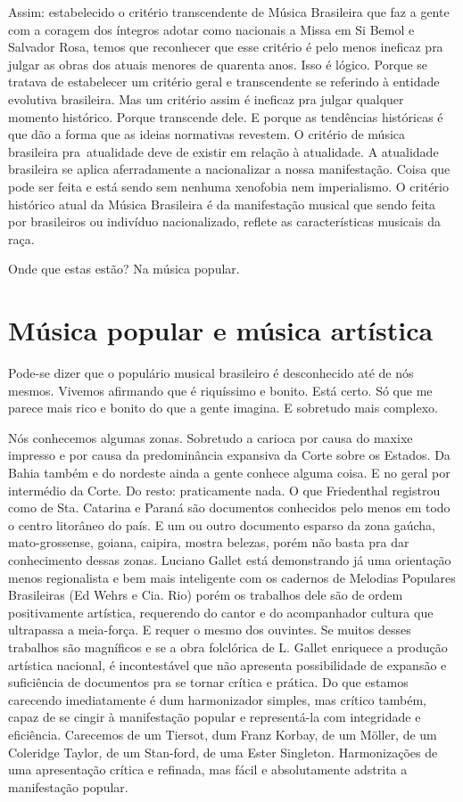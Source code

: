 Assim: estabelecido o critério transcendente de Música Brasileira que
faz a gente com a coragem dos íntegros adotar como nacionais a Missa em
Si Bemol e Salvador Rosa, temos que reconhecer que esse critério é pelo
menos ineficaz pra julgar as obras dos atuais menores de quarenta anos.
Isso é lógico. Porque se tratava de estabelecer um critério geral e
transcendente se referindo à entidade evolutiva brasileira. Mas um
critério assim é ineficaz pra julgar qualquer momento histórico. Porque
transcende dele. E porque as tendências históricas é que dão a forma que
as ideias normativas revestem. O critério de música brasileira
pra~atualidade deve de existir em relação à atualidade. A atualidade
brasileira se aplica aferradamente a nacionalizar a nossa manifestação.
Coisa que pode ser feita e está sendo sem nenhuma xenofobia nem
imperialismo. O critério histórico atual da Música Brasileira é da
manifestação musical que sendo feita por brasileiros ou indivíduo
nacionalizado, reflete as características musicais da raça.

Onde que estas estão? Na música popular.

\section{Música popular e música artística}

Pode-se dizer que o populário musical brasileiro é desconhecido até de
nós mesmos. Vivemos afirmando que é riquíssimo e bonito. Está certo. Só
que me parece mais rico e bonito do que a gente imagina. E sobretudo
mais complexo.

Nós conhecemos algumas zonas. Sobretudo a carioca por causa do maxixe
impresso e por causa da predominância expansiva da Corte sobre os
Estados. Da Bahia também e do nordeste ainda a gente conhece alguma
coisa. E no geral por intermédio da Corte. Do resto: praticamente nada.
O que Friedenthal registrou como de Sta. Catarina e Paraná são
documentos conhecidos pelo menos em todo o centro litorâneo do país. E
um ou outro documento esparso da zona gaúcha, mato-grossense, goiana,
caipira, mostra belezas, porém não basta pra dar conhecimento dessas
zonas. Luciano Gallet está demonstrando já uma orientação menos
regionalista e bem mais inteligente com os cadernos de Melodias
Populares Brasileiras (Ed Wehrs e Cia. Rio) porém os trabalhos dele são
de ordem positivamente artística, requerendo do cantor e do acompanhador
cultura que ultrapassa a meia-força. E requer o mesmo dos ouvintes. Se
muitos desses trabalhos são magníficos e se a obra folclórica de L.
Gallet enriquece a produção artística nacional, é incontestável que não
apresenta possibilidade de expansão e suficiência de documentos pra se
tornar crítica e prática. Do que estamos carecendo imediatamente é dum
harmonizador simples, mas crítico também, capaz de se cingir à
manifestação popular e representá-la com integridade e eficiência.
Carecemos de um Tiersot, dum Franz Korbay, de um Möller, de um Coleridge
Taylor, de um Stan-ford, de uma Ester Singleton. Harmonizações de uma
apresentação crítica e refinada, mas fácil e absolutamente adstrita a
manifestação popular.

